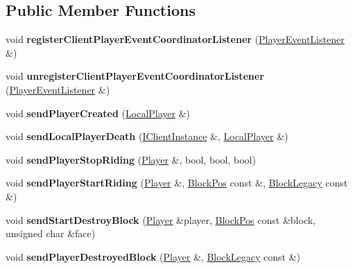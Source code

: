 \subsection*{Public Member Functions}
\begin{DoxyCompactItemize}
\item 
\mbox{\label{struct_client_player_event_coordinator_a0f52c211392be7cc0e7c0ea27c495e24}} 
void {\bfseries register\+Client\+Player\+Event\+Coordinator\+Listener} (\mbox{\hyperlink{class_player_event_listener}{Player\+Event\+Listener}} \&)
\item 
\mbox{\label{struct_client_player_event_coordinator_a30a68e518eb36fd67eac1c5f0837a8d8}} 
void {\bfseries unregister\+Client\+Player\+Event\+Coordinator\+Listener} (\mbox{\hyperlink{class_player_event_listener}{Player\+Event\+Listener}} \&)
\item 
\mbox{\label{struct_client_player_event_coordinator_ad5d864f72ff7f83486a9c9c61bede011}} 
void {\bfseries send\+Player\+Created} (\mbox{\hyperlink{struct_local_player}{Local\+Player}} \&)
\item 
\mbox{\label{struct_client_player_event_coordinator_a3f9029e8703fbbd7d8dbca82809a789d}} 
void {\bfseries send\+Local\+Player\+Death} (\mbox{\hyperlink{class_i_client_instance}{I\+Client\+Instance}} \&, \mbox{\hyperlink{struct_local_player}{Local\+Player}} \&)
\item 
\mbox{\label{struct_client_player_event_coordinator_aee5d040c9d1e1c2fae7d30ae25738b0d}} 
void {\bfseries send\+Player\+Stop\+Riding} (\mbox{\hyperlink{struct_player}{Player}} \&, bool, bool, bool)
\item 
\mbox{\label{struct_client_player_event_coordinator_a7d68506745f7867695efad53194542ed}} 
void {\bfseries send\+Player\+Start\+Riding} (\mbox{\hyperlink{struct_player}{Player}} \&, \mbox{\hyperlink{struct_block_pos}{Block\+Pos}} const \&, \mbox{\hyperlink{class_block_legacy}{Block\+Legacy}} const \&)
\item 
\mbox{\label{struct_client_player_event_coordinator_ad6c8cc5ccb08ca34ac1bc2cc144c67ff}} 
void {\bfseries send\+Start\+Destroy\+Block} (\mbox{\hyperlink{struct_player}{Player}} \&player, \mbox{\hyperlink{struct_block_pos}{Block\+Pos}} const \&block, unsigned char \&face)
\item 
\mbox{\label{struct_client_player_event_coordinator_aeeac18f5207bd2c9fa4676f647c7e524}} 
void {\bfseries send\+Player\+Destroyed\+Block} (\mbox{\hyperlink{struct_player}{Player}} \&, \mbox{\hyperlink{class_block_legacy}{Block\+Legacy}} const \&)
\end{DoxyCompactItemize}


